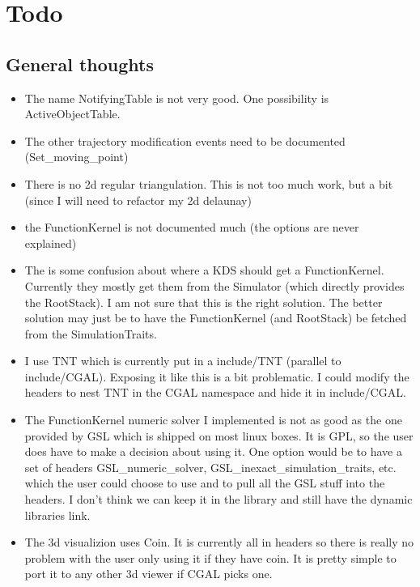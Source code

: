 \section{Todo}

\subsection{General thoughts}

\begin{itemize}

\item The name NotifyingTable is not very good. One possibility is
ActiveObjectTable.

\item The other trajectory modification events need to be documented
(Set\_moving\_point)

\item There is no 2d regular triangulation. This is not too much work,
but a bit (since I will need to refactor my 2d delaunay)

\item the FunctionKernel is not documented much (the options are never
explained)

\item The is some confusion about where a KDS should get a
FunctionKernel. Currently they mostly get them from the Simulator
(which directly provides the RootStack). I am not sure that this is
the right solution. The better solution may just be to have the
FunctionKernel (and RootStack) be fetched from the SimulationTraits.

\item I use TNT which is currently put in a include/TNT (parallel to
include/CGAL). Exposing it like this is a bit problematic. I could
modify the headers to nest TNT in the CGAL namespace and hide it in
include/CGAL.

\item The FunctionKernel numeric solver I implemented is not as good
as the one provided by GSL which is shipped on most linux boxes. It is
GPL, so the user does have to make a decision about using it. One
option would be to have a set of headers GSL\_numeric\_solver,
GSL\_inexact\_simulation\_traits, etc. which the user could choose to use
and to pull all the GSL stuff into the headers. I don't think we can
keep it in the library and still have the dynamic libraries link.

\item The 3d visualizion uses Coin. It is currently all in headers so
there is really no problem with the user only using it if they have
coin. It is pretty simple to port it to any other 3d viewer if CGAL
picks one.


\end{itemize}
